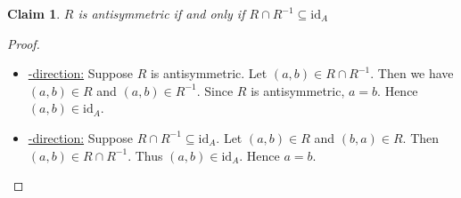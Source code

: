 \documentclass[12pt,aspectratio=169]{beamer}
\theoremstyle{claim}
\newtheorem{claim}[theorem]{Claim}%
\begin{document}
\begin{frame}
    \begin{claim}
        $R$ is antisymmetric if and only if $R \cap R^{-1} \subseteq \mathrm{id}_A$
    \end{claim}
    \begin{proof}
        \begin{itemize}
            \item \underline{\Rightarrow-direction:}
                Suppose $R$ is antisymmetric.
                Let $(a,b) \in R \cap R^{-1}$.
                Then we have $(a,b) \in R$ and $(a,b) \in R^{-1}$.
                Since $R$ is antisymmetric, $a=b$. Hence $(a,b) \in \mathrm{id}_A$.
            \item \underline{\Leftarrow-direction:}
                Suppose $R \cap R^{-1} \subseteq \mathrm{id}_A$.
                Let $(a,b) \in R$ and $(b,a) \in R$.
                Then $(a,b) \in R \cap R^{-1}$.
                Thus $(a,b) \in \mathrm{id}_A$.
                Hence $a = b$.
        \end{itemize}
    \end{proof}
\end{frame}
\end{document}
